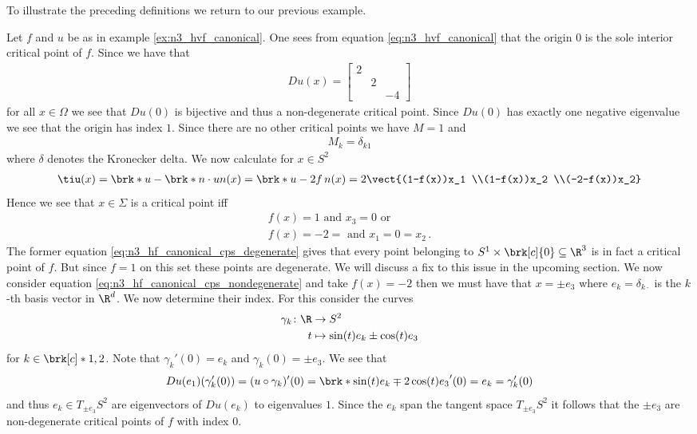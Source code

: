 To illustrate the preceding definitions we return to our previous example.
\begin{example}
  Let $f$ and $u$ be as in example \ref{ex:n3_hvf_canonical}. One sees from equation \eqref{eq:n3_hvf_canonical}
  that the origin $0$ is the sole interior critical point of $f$. Since we have that
  \begin{align*}
    Du(x) = \begin{bmatrix}
      2 & & \\
       & 2 & \\
      & & -4
    \end{bmatrix}
  \end{align*}
  for all $x\in\Omega$ we see that $Du(0)$ is bijective and thus a non-degenerate critical point. Since $Du(0)$ has
  exactly one negative eigenvalue we see that the origin has index $1$. Since there are no other critical points we have
  $M=1$ and
  \begin{align*}
    M_k=\delta_{k1}
  \end{align*}
  where $\delta$ denotes the Kronecker delta.
  We now calculate for $x\in S^2$
  \begin{align*}
    \tiu(x) = \brk*{u-\brk*{n\cdot u}n}(x)
    = \brk*{u-2f\,n}(x)
    = 2\vect{(1-f(x))x_1 \\(1-f(x))x_2 \\(-2-f(x))x_2}
  \end{align*}
  Hence we see that $x\in\Sigma$ is a critical point iff 
  \begin{align}
    f(x)=1 \text{ and }x_3=0\text{ or } \label{eq:n3_hf_canonical_cps_degenerate} \\
    f(x)=-2 = \text{ and }x_1=0=x_2\,. \label{eq:n3_hf_canonical_cps_nondegenerate}
  \end{align}
  The former equation \eqref{eq:n3_hf_canonical_cps_degenerate} gives that every
  point belonging to $S^1\times\brk[c]{0}\subseteq\R^3$ is in fact a critical point of $f$.
  But since $f=1$ on this set these points are degenerate.
  We will discuss a fix to this issue in the upcoming section.
  We now consider equation \eqref{eq:n3_hf_canonical_cps_nondegenerate} and take 
   $f(x)=-2$ then we must have that $x=\pm e_3$ where $e_k=\delta_{k\cdot}$
  is the $k$-th basis vector in $\R^d$. We now determine their index. For this consider the curves
  \begin{align*}
    \gamma_k\colon\R&\to S^2\\
    t&\mapsto \sin(t)e_k\pm\cos(t)e_3
  \end{align*}
  for $k\in\brk[c]*{1,2}$.
  Note that $\gamma_k'(0)=e_k$ and $\gamma_k(0)=\pm e_3$.
  We see that
  \begin{align*}
    Du(e_1)(\gamma_k'(0))=(u\circ\gamma_k)'(0)
    =\brk*{\sin(t)e_k\mp2\cos(t)e_3}'(0)
    =e_k=\gamma_k'(0)
  \end{align*}
  and thus $e_k\in T_{\pm e_3}S^2$ are eigenvectors of $Du(e_k)$ to eigenvalues $1$.
  Since the $e_k$ span the tangent space $T_{\pm e_3}S^2$ it follows that
  the $\pm e_3$ are non-degenerate critical points of $f$ with index $0$.
\end{example}

